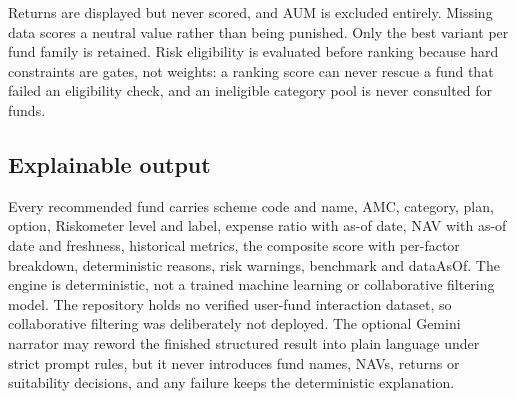Returns are displayed but never scored, and AUM is excluded entirely. Missing data scores a neutral value rather than being punished. Only the best variant per fund family is retained. Risk eligibility is evaluated before ranking because hard constraints are gates, not weights: a ranking score can never rescue a fund that failed an eligibility check, and an ineligible category pool is never consulted for funds.

\subsection{Explainable output}

Every recommended fund carries scheme code and name, AMC, category, plan, option, Riskometer level and label, expense ratio with as-of date, NAV with as-of date and freshness, historical metrics, the composite score with per-factor breakdown, deterministic reasons, risk warnings, benchmark and dataAsOf. The engine is deterministic, not a trained machine learning or collaborative filtering model. The repository holds no verified user-fund interaction dataset, so collaborative filtering was deliberately not deployed. The optional Gemini narrator may reword the finished structured result into plain language under strict prompt rules, but it never introduces fund names, NAVs, returns or suitability decisions, and any failure keeps the deterministic explanation.